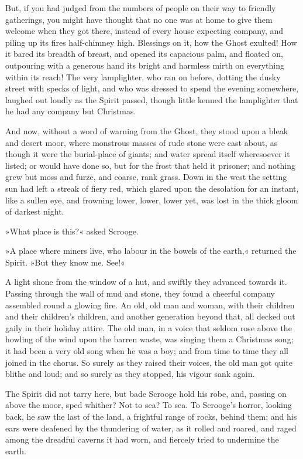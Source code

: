 But, if you had judged from the numbers of people on their way to friendly gatherings, you might have thought that no one was at home to give them welcome when they got there, instead of every house expecting company, and piling up its fires half-chimney high. Blessings on it, how the Ghost exulted! How it bared its breadth of breast, and opened its capacious palm, and floated on, outpouring with a generous hand its bright and harmless mirth on everything within its reach! The very lamplighter, who ran on before, dotting the dusky street with specks of light, and who was dressed to spend the evening somewhere, laughed out loudly as the Spirit passed, though little kenned the lamplighter that he had any company but Christmas.

And now, without a word of warning from the Ghost, they stood upon a bleak and desert moor, where monstrous masses of rude stone were cast about, as though it were the burial-place of giants; and water spread itself wheresoever it listed; or would have done so, but for the frost that held it prisoner; and nothing grew but moss and furze, and coarse, rank grass. Down in the west the setting sun had left a streak of fiery red, which glared upon the desolation for an instant, like a sullen eye, and frowning lower, lower, lower yet, was lost in the thick gloom of darkest night.

»What place is this?« asked Scrooge.

»A place where miners live, who labour in the bowels of the earth,« returned the Spirit. »But they know me. See!«

A light shone from the window of a hut, and swiftly they advanced towards it. Passing through the wall of mud and stone, they found a cheerful company assembled round a glowing fire. An old, old man and woman, with their children and their children's children, and another generation beyond that, all decked out gaily in their holiday attire. The old man, in a voice that seldom rose above the howling of the wind upon the barren waste, was singing them a Christmas song; it had been a very old song when he was a boy; and from time to time they all joined in the chorus. So surely as they raised their voices, the old man got quite blithe and loud; and so surely as they stopped, his vigour sank again.

The Spirit did not tarry here, but bade Scrooge hold his robe, and, passing on above the moor, sped whither? Not to sea? To sea. To Scrooge's horror, looking back, he saw the last of the land, a frightful range of rocks, behind them; and his ears were deafened by the thundering of water, as it rolled and roared, and raged among the dreadful caverns it had worn, and fiercely tried to undermine the earth.

